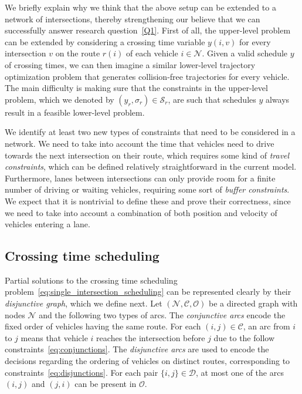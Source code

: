 \documentclass{article}
\theoremstyle{definition}
\theoremstyle{plain}
\begin{document}

We briefly explain why we think that the above setup can be extended to a
network of intersections, thereby strengthening our believe that we can
successfully answer research question~\ref{Q1}.
%
First of all, the upper-level problem can be extended by considering a crossing
time variable $y(i, v)$ for every intersection $v$ on the route $r(i)$ of each
vehicle $i\in \mathcal{N}$. Given a valid schedule $y$ of crossing times, we can
then imagine a similar lower-level trajectory optimization problem that
generates collision-free trajectories for every vehicle. The main difficulty is
making sure that the constraints in the upper-level problem, which we denoted by
$(y_{r}, \sigma_{r}) \in \mathcal{S}_{r}$, are such that schedules $y$ always
result in a feasible lower-level problem.

We identify at least two new types of constraints that need to be considered in
a network. We need to take into account the time that vehicles need to drive
towards the next intersection on their route, which requires some kind of
\textit{travel constraints}, which can be defined relatively straightforward in
the current model. Furthermore, lanes between intersections can only provide
room for a finite number of driving or waiting vehicles, requiring some sort of
\textit{buffer constraints}. We expect that it is nontrivial to define these and
prove their correctness, since we need to take into account a combination of
both position and velocity of vehicles entering a lane.


\subsection{Crossing time scheduling}

Partial solutions to the crossing time scheduling
problem~\eqref{eq:single_intersection_scheduling} can be represented
clearly by their \textit{disjunctive graph}, which we define next. Let
$(\mathcal{N}, \mathcal{C}, \mathcal{O})$ be a directed graph with nodes
$\mathcal{N}$ and the following two types of arcs. The \textit{conjunctive arcs}
encode the fixed order of vehicles having the same route. For each
$(i,j) \in \mathcal{C}$, an arc from $i$ to $j$ means that vehicle $i$ reaches
the intersection before $j$ due to the follow
constraints~\eqref{eq:conjunctions}. The \textit{disjunctive arcs} are used to
encode the decisions regarding the ordering of vehicles on distinct routes,
corresponding to constraints~\eqref{eq:disjunctions}. For each pair
$\{i,j\} \in \mathcal{D}$, at most one of the arcs $(i,j)$ and $(j,i)$ can be
present in $\mathcal{O}$.
\end{document}
